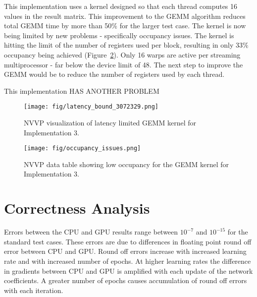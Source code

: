 \documentclass[12pt]{article}
\begin{document}
This implementation uses a kernel designed so that each thread computes 16 values in the result matrix. This improvement to the GEMM algorithm reduces total GEMM time by more than 50\% for the larger test case. The kernel is now being limited by new problems - specifically occupancy issues. The kernel is hitting the limit of the number of registers used per block, resulting in only 33\% occupancy being achieved (Figure~\ref{fig:occupancy_3}). Only 16 warps are active per streaming multiprocessor - far below the device limit of 48. The next step to improve the GEMM would be to reduce the number of registers used by each thread.

This implementation HAS ANOTHER PROBLEM

\begin{figure}[htb]
	\begin{center}
		\texttt{[image: fig/latency\_bound\_3072329.png]}
		\caption{NVVP visualization of latency limited GEMM kernel for Implementation 3.}
		\label{fig:lat_bnd_3}
	\end{center}
\end{figure}

\begin{figure}[htb]
	\begin{center}
		\texttt{[image: fig/occupancy\_issues.png]}
		\caption{NVVP data table showing low occupancy for the GEMM kernel for Implementation 3.}
		\label{fig:occupancy_3}
	\end{center}
\end{figure}




\section*{Correctness Analysis}

Errors between the CPU and GPU results range between $10^{-7}$ and $10^{-15}$ for the standard test cases. These errors are due to differences in floating point round off error between CPU and GPU. Round off errors increase with increased learning rate and with increased number of epochs. At higher learning rates the difference in gradients between CPU and GPU is amplified with each update of the network coefficients. A greater number of epochs causes accumulation of round off errors with each iteration.
\end{document}
